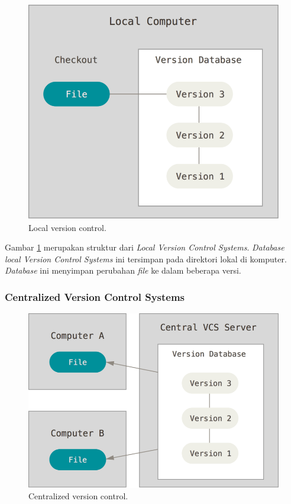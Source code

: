 \begin{figure}[H]
	\centering
		\includegraphics[scale=0.25]{Gambar/localvcs.png}
	\caption{Local version control\cite{chacon2014pro}.}
	\label{fig:localvcs}
\end{figure}

Gambar \ref{fig:localvcs} merupakan struktur dari \textit{Local Version Control Systems}. \textit{Database local Version Control Systems} ini tersimpan pada direktori lokal di komputer. \textit{Database} ini menyimpan perubahan \textit{file} ke dalam beberapa versi.  
 
\subsubsection{Centralized Version Control Systems}
\begin{figure}[H]
	\centering
		\includegraphics[scale=0.25]{Gambar/centralizedvcs.png}
	\caption{Centralized version control\cite{chacon2014pro}.}
	\label{fig:cvcs}
\end{figure}

